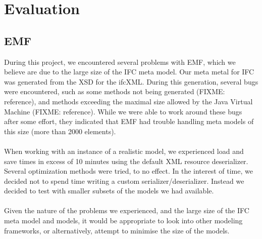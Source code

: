 \section{Evaluation}




\subsection{EMF}
\label{Evaluation_EMF}
During this project, we encountered several problems with EMF, which we believe are due to the large size of the IFC meta model. Our meta metal for IFC was generated from the XSD for the ifcXML. During this generation, several bugs were encountered, such as some methods not being generated (FIXME: reference), and methods exceeding the maximal size allowed by the Java Virtual Machine (FIXME: reference). While we were able to work around these bugs after some effort, they indicated that EMF had trouble handling meta models of this size (more than 2000 elements).
\paragraph{}
When working with an instance of a realistic model, we experienced load and save times in excess of 10 minutes using the default XML resource deserializer. Several optimization methods were tried\cite{emfperformancetips, emfperformanceandextensibility}, to no effect. In the interest of time, we decided not to spend time writing a custom serializer/deserializer. Instead we decided to test with smaller subsets of the models we had available.
\paragraph{}
Given the nature of the problems we experienced, and the large size of the IFC meta model and models, it would be appropriate to look into other modeling frameworks, or alternatively, attempt to minimise the size of the models.
